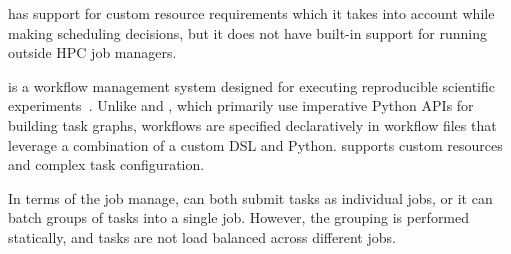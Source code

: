 \ray{} has support for custom resource requirements which it takes into account while making
scheduling decisions, but it does not have built-in support for running outside HPC job managers.

\snakemake{} is a workflow management system designed for executing reproducible
scientific experiments~\cite{snakemake}. Unlike \dask{} and \ray{}, which primarily use
imperative Python APIs for building task graphs, \snakemake{} workflows are specified declaratively
in workflow files that leverage a combination of a custom DSL and Python. \snakemake{} supports
custom resources and complex task configuration.

In terms of the job manage, \snakemake{} can both submit tasks as individual jobs, or it can
batch groups of tasks into a single job. However, the grouping is performed statically, and tasks
are not load balanced across different jobs.

